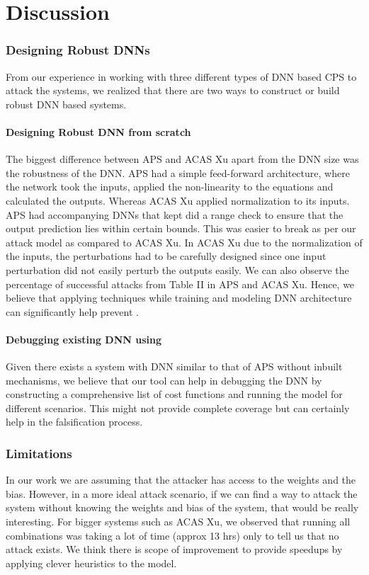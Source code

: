 \chapter{Discussion}

\subsection{Designing Robust DNNs}
From our experience in working with three different types of DNN based CPS to attack the systems, we realized that there are two ways to construct or build robust DNN based systems. 
\subsubsection{Designing Robust DNN from scratch}
The biggest difference between APS and ACAS Xu apart from the DNN size was the robustness of the DNN. APS had a simple feed-forward architecture, where the network took the inputs, applied the non-linearity to the equations and calculated the outputs. Whereas ACAS Xu applied normalization to its inputs. 
APS had accompanying DNNs that kept did a range check to ensure that the output prediction lies within certain bounds. This was easier to break as per our attack model as compared to ACAS Xu. In ACAS Xu due to the normalization of the inputs, the perturbations had to be carefully designed since one input perturbation did not easily perturb the outputs easily. We can also observe the percentage of successful attacks from Table II in APS and ACAS Xu. Hence, we believe that applying techniques while training and modeling DNN architecture can significantly help prevent \attack. 
\subsubsection{Debugging existing DNN using \tool}
Given there exists a system with DNN similar to that of APS without inbuilt mechanisms, we believe that our tool can help in debugging the DNN by constructing a comprehensive list of cost functions and running the model for different scenarios. This might not provide complete coverage but can certainly help in the falsification process. 


\subsection{ Limitations}
In our work we are assuming that the attacker has access to the weights and the bias. However, in a more ideal attack scenario, if we can find a way to  attack the system without knowing the weights and bias of the system, that would be really interesting. %
For bigger systems such as ACAS Xu, we observed that running all combinations was taking a lot of time (approx 13 hrs) only to tell us that no attack exists. We think there is scope of improvement to provide speedups by applying clever heuristics to the model. 

